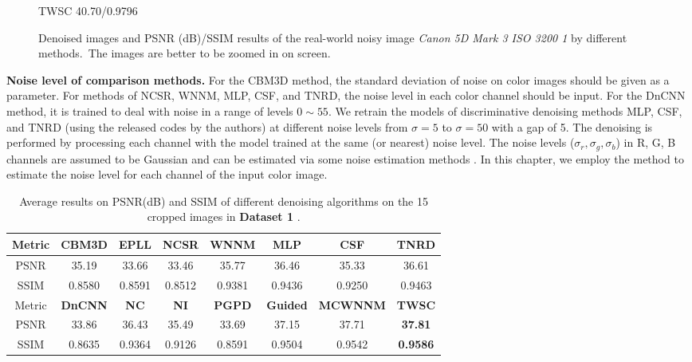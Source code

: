 \begin{figure}
{\begin{minipage}[t]{0.24\textwidth}
{\footnotesize TWSC 40.70/0.9796}
\end{minipage}
}\vspace{-3mm}
    \caption{Denoised images and PSNR (dB)/SSIM results of the real-world noisy image \textsl{Canon 5D Mark 3 ISO 3200 1} \cite{crosschannel2016} by different methods.\ The images are better to be zoomed in on screen.}
    \label{fig6-5}
\end{figure}

\textbf{Noise level of comparison methods.} For the CBM3D method, the standard deviation of noise on color images should be given as a parameter. For methods of NCSR,  WNNM, MLP, CSF, and TNRD, the noise level in each color channel should be input. For the DnCNN method, it is trained to deal with noise in a range of levels $0\sim55$. We retrain the models of discriminative denoising methods MLP, CSF, and TNRD (using the released codes by the authors) at different noise levels from $\sigma=5$ to $\sigma=50$ with a gap of 5. The denoising is performed by processing each channel with the model trained at the same (or nearest) noise level. The noise levels ($\sigma_{r}, \sigma_{g}, \sigma_{b}$) in R, G, B channels are assumed to be Gaussian and can be estimated via some noise estimation methods \cite{noiselevel,Chen2015ICCV}. In this chapter, we employ the method \cite{noiselevel} to estimate the noise level for each channel of the input color image.


\begin{table}[t!]
\caption{Average results on PSNR(dB) and SSIM of different denoising algorithms on the 15 cropped images in \textbf{Dataset 1} \cite{crosschannel2016}.}
\footnotesize
\label{tab6-6}
\begin{center}
\renewcommand\arraystretch{1.2}
\begin{tabular*}{1\textwidth}{@{\extracolsep{\fill}}cccccccc}
\hline
Metric
&
\textbf{CBM3D}
&
\textbf{EPLL}
&
\textbf{NCSR}
&
\textbf{WNNM}
&
\textbf{MLP}
&
\textbf{CSF}
&
\textbf{TNRD}
\\
\hline
PSNR & 35.19  & 33.66 & 33.46 &  35.77 &  36.46 & 35.33 & 36.61  
\\
\hline
SSIM & 0.8580 & 0.8591  & 0.8512 & 0.9381 &  0.9436  & 0.9250 & 0.9463 
\\
\hline
Metric
&
\textbf{DnCNN}
&
\textbf{NC}
&
\textbf{NI}
&
\textbf{PGPD}
&
\textbf{Guided}
&
\textbf{MCWNNM}
&
\textbf{TWSC}
\\
\hline
PSNR &  33.86  & 36.43  & 35.49  & 33.69  &  37.15 &  37.71 &  \textbf{37.81}
\\
\hline
SSIM & 0.8635  &  0.9364 & 0.9126  & 0.8591  & 0.9504 &  0.9542 & \textbf{0.9586}
\\
\hline
\end{tabular*}
\end{center}
\end{table}


